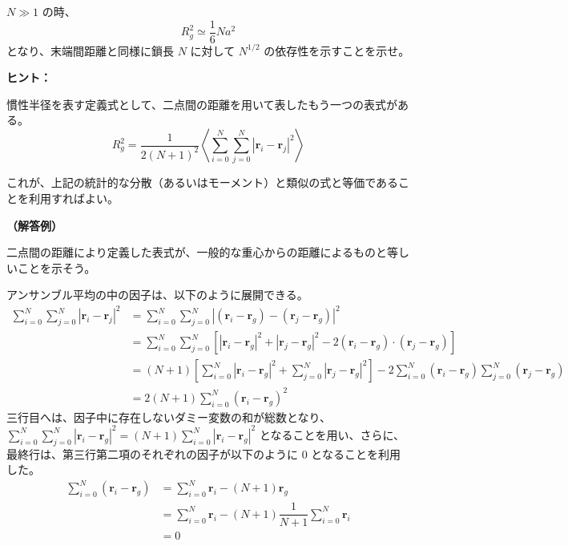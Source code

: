 \documentclass[uplatex,dvipdfmx,a4paper,11pt]{jsarticle}
\begin{document}
$N \gg 1$ の時、
\begin{equation*}
R_g^2 \simeq \dfrac{1}{6}N a^2
\end{equation*}
となり、末端間距離と同様に鎖長 $N$ に対して $N^{1/2}$ の依存性を示すことを示せ。

\vspace{10pt}

\begin{itembox}[l]{{\bf ヒント：}}

慣性半径を表す定義式として、二点間の距離を用いて表したもう一つの表式がある。
\begin{equation*}
R_g^2 = \dfrac{1}{2(N+1)^2} \left \langle \sum_{i=0}^N \sum_{j=0}^N \left| \bm{r}_i - \bm{r}_j \right|^2 \right \rangle
\end{equation*}

これが、上記の統計的な分散（あるいはモーメント）と類似の式と等価であることを利用すればよい。
\end{itembox}

\vspace{10pt}
{\bf （解答例）}

二点間の距離により定義した表式が、一般的な重心からの距離によるものと等しいことを示そう。

アンサンブル平均の中の因子は、以下のように展開できる。
\begin{align*}
\sum_{i = 0}^N \sum_{j=0}^N \left| \bm{r}_i - \bm{r}_j \right|^2
	&= \sum_{i = 0}^N \sum_{j=0}^N  \left| (\bm{r}_i - \bm{r}_g) - (\bm{r}_j - \bm{r}_g) \right|^2 \\
	&= \sum_{i = 0}^N \sum_{j=0}^N \left[ \left| \bm{r}_i - \bm{r}_g \right|^2 + \left|\bm{r}_j - \bm{r}_g \right|^2 -2 (\bm{r}_i - \bm{r}_g) \cdot (\bm{r}_j - \bm{r}_g) \right] \\
	&= (N + 1) \left[ \sum_{i=0}^N \left| \bm{r}_i - \bm{r}_g \right|^2 + \sum_{j=0}^N \left| \bm{r}_j - \bm{r}_g \right|^2 \right] -2 \sum_{i=0}^N (\bm{r}_i - \bm{r}_g) \sum_{j=0}^N (\bm{r}_j - \bm{r}_g) \\
	&= 2(N + 1) \sum_{i=0}^N (\bm{r}_i- \bm{r}_g)^2 
\end{align*}
三行目へは、因子中に存在しないダミー変数の和が総数となり、$\sum_{i = 0}^N \sum_{j=0}^N \left| \bm{r}_i - \bm{r}_g \right|^2 = (N+1) \sum_{i = 0}^N \left| \bm{r}_i - \bm{r}_g \right|^2 $ となることを用い、さらに、最終行は、第三行第二項のそれぞれの因子が以下のように 0 となることを利用した。
\begin{align*}
\sum_{i=0}^N (\bm{r}_i - \bm{r}_g) 
	&= \sum_{i=0}^N \bm{r}_i -(N+1) \bm{r}_g \\
	&= \sum_{i=0}^N \bm{r}_i -(N+1) \dfrac{1}{N+1} \sum_{i=0}^{N} \bm{r}_i \\
	&=0
\end{align*}
\end{document}
